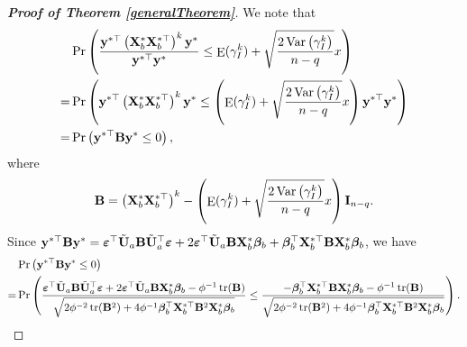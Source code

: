 \documentclass[11pt]{article}
\DeclareMathOperator{\mytr}{tr}
\DeclareMathOperator{\myE}{E}
\DeclareMathOperator{\myVar}{Var}
\newcommand{\By}{\mathbf{y}}    \newcommand{\Bz}{\mathbf{z}}
\newcommand{\bfsym}[1]{\ensuremath{\boldsymbol{#1}}}
\def\bbeta{\bfsym \beta}
\theoremstyle{plain}
\theoremstyle{definition}
\theoremstyle{remark}
\begin{document}
\begin{appendices}
\begin{proof}[\textbf{Proof of Theorem \ref{generalTheorem}}]
We note that
\begin{equation}
    \begin{split}
    &\Pr\left( 
        \frac{
            \By^{*\top} \left( \BX_b^* \BX_b^{*\top} \right)^k \By^*
        }{
            \By^{*\top} \By^*
        } 
        \leq 
        \myE (\gamma_I^k)
        +\sqrt{
            \frac{2\myVar\left( \gamma_I^k \right)}{n-q} 
        }
        x
    \right) 
    \\
    =&
    \Pr\left( 
            \By^{*\top} \left( \BX_b^* \BX_b^{*\top} \right)^k \By^*
        \leq 
        \left( 
            \myE (\gamma_I^k)
        +\sqrt{
            \frac{2\myVar\left( \gamma_I^k \right)}{n-q} 
        }
        x
        \right)
            \By^{*\top} \By^*
    \right) 
    \\
    =&
    \Pr\left( 
            \By^{*\top}
            \BB
            \By^*
            \leq 0
    \right) 
    ,
    \end{split}
    \label{eq:to2}
\end{equation}
where
\begin{equation*}
   \BB= 
            \left( \BX_b^* \BX_b^{*\top} \right)^k 
        -
        \left( 
            \myE (\gamma_I^k)
        +\sqrt{
            \frac{2\myVar\left( \gamma_I^k \right)}{n-q} 
        }
        x
        \right)
        \BI_{n-q}.
\end{equation*}
Since $\By^{*\top} \BB \By^*= \bepsilon^\top \tilde{\BU}_a \BB \tilde{\BU}_a^\top\bepsilon + 2\bepsilon^\top \tilde{\BU}_a \BB \BX_b^* \bbeta_b + \bbeta_b^{\top} \BX_b^{*\top} \BB \BX_b^* \bbeta_b$, we have
\begin{equation*}
    \begin{split}
     &\Pr\left( 
            \By^{*\top}
            \BB
            \By^*
            \leq 0
    \right) 
    \\
    =&
    \Pr\left( 
        \frac{
    \bepsilon^\top \tilde{\BU}_a \BB \tilde{\BU}_a^\top\bepsilon + 2\bepsilon^\top \tilde{\BU}_a \BB \BX_b^* \bbeta_b 
    -\phi^{-1}\mytr(\BB)
}{
    \sqrt{
        2\phi^{-2}\mytr(\BB^2)
        +4 \phi^{-1}
        \bbeta_b^\top
        \BX_b^{*\top}
        \BB^2
        \BX_b^*
        \bbeta_b
    }
}
    \leq
    \frac{
        -\bbeta_b^{\top} \BX_b^{*\top} \BB \BX_b^* \bbeta_b
        -\phi^{-1}\mytr(\BB)
    }{
    \sqrt{
        2\phi^{-2}
        \mytr(\BB^2)
        +4\phi^{-1}
        \bbeta_b^\top
        \BX_b^{*\top}
        \BB^2
        \BX_b^*
        \bbeta_b
    }
    }
\right).
    \end{split}

\end{equation*}
\end{proof}
\end{appendices}
\end{document}
